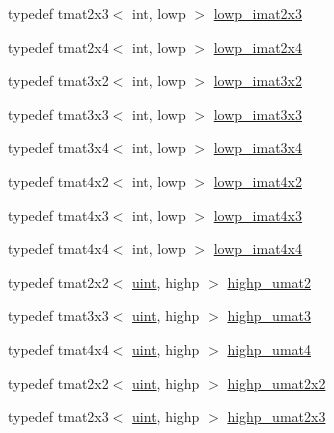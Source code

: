 \begin{DoxyCompactItemize}
\item 
typedef tmat2x3$<$ int, lowp $>$ \hyperlink{group__gtc__matrix__integer_ga00e00501dd9bf929e1dca7a167ba526b}{lowp\+\_\+imat2x3}
\item 
typedef tmat2x4$<$ int, lowp $>$ \hyperlink{group__gtc__matrix__integer_gaf664d339f1b66e62ed07c913e60be940}{lowp\+\_\+imat2x4}
\item 
typedef tmat3x2$<$ int, lowp $>$ \hyperlink{group__gtc__matrix__integer_ga93514d2df726334e6d5edd373635d343}{lowp\+\_\+imat3x2}
\item 
typedef tmat3x3$<$ int, lowp $>$ \hyperlink{group__gtc__matrix__integer_ga434abdeee9a8908660691be659f6693f}{lowp\+\_\+imat3x3}
\item 
typedef tmat3x4$<$ int, lowp $>$ \hyperlink{group__gtc__matrix__integer_ga61fe3487c1f4f10fb0f5c9fa0873a694}{lowp\+\_\+imat3x4}
\item 
typedef tmat4x2$<$ int, lowp $>$ \hyperlink{group__gtc__matrix__integer_ga87e2118b22cbc6916805aafcda52a943}{lowp\+\_\+imat4x2}
\item 
typedef tmat4x3$<$ int, lowp $>$ \hyperlink{group__gtc__matrix__integer_ga76c201715b216ddd5d7de3c3759211f1}{lowp\+\_\+imat4x3}
\item 
typedef tmat4x4$<$ int, lowp $>$ \hyperlink{group__gtc__matrix__integer_ga46f8dc46c3dcde8fa2e8b8f645c0d9ef}{lowp\+\_\+imat4x4}
\item 
typedef tmat2x2$<$ \hyperlink{stb__image_8c_a91ad9478d81a7aaf2593e8d9c3d06a14}{uint}, highp $>$ \hyperlink{group__gtc__matrix__integer_ga113fe97aa8688eaa287a02f8362f3e47}{highp\+\_\+umat2}
\item 
typedef tmat3x3$<$ \hyperlink{stb__image_8c_a91ad9478d81a7aaf2593e8d9c3d06a14}{uint}, highp $>$ \hyperlink{group__gtc__matrix__integer_ga58bc8d0aeac88af0d38723b5cfa4fa67}{highp\+\_\+umat3}
\item 
typedef tmat4x4$<$ \hyperlink{stb__image_8c_a91ad9478d81a7aaf2593e8d9c3d06a14}{uint}, highp $>$ \hyperlink{group__gtc__matrix__integer_ga7b0e78c54432c7236d8b96473b7423ec}{highp\+\_\+umat4}
\item 
typedef tmat2x2$<$ \hyperlink{stb__image_8c_a91ad9478d81a7aaf2593e8d9c3d06a14}{uint}, highp $>$ \hyperlink{group__gtc__matrix__integer_gaeb546847abfc7c3c09ea8172987ebb16}{highp\+\_\+umat2x2}
\item 
typedef tmat2x3$<$ \hyperlink{stb__image_8c_a91ad9478d81a7aaf2593e8d9c3d06a14}{uint}, highp $>$ \hyperlink{group__gtc__matrix__integer_gab058a0a12ea7f604d92baeb7a0e54f3b}{highp\+\_\+umat2x3}
\item 

\end{DoxyCompactItemize}
